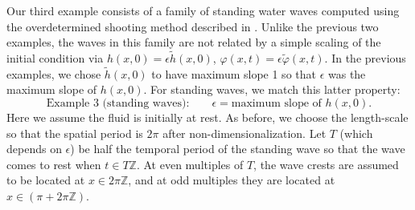 \documentclass[11pt]{article}
\theoremstyle{plain}
\theoremstyle{definition}
\theoremstyle{definition}
\newcommand{\eps}{\epsilon}
\def\bbZ{{\mathbb Z}}
\begin{document}
Our third example consists of a family of standing water waves
computed using the overdetermined shooting method described in
\cite{wilkening:standing-waves-2011,wilkening-yu:shooting-2012}. Unlike
the previous two examples, the waves in this family are not related by
a simple scaling of the initial condition via $h(x,0)=\eps\tilde
h(x,0)$, $\varphi(x,t)=\eps\tilde\varphi(x,t)$.
%
%
In the previous examples, we chose $\tilde h(x,0)$ to have maximum slope 1 so
that $\eps$ was the maximum slope of $h(x,0)$.  For standing waves, we
match this latter property:
%
\begin{equation}\label{eq:stand:eps}
  \text{Example 3 (standing waves):}\qquad \eps = \text{
    maximum slope of $h(x,0)$.}
\end{equation}
%
Here we assume the fluid is initially at rest.
As before, we choose the length-scale so that the spatial period
is $2\pi$ after non-dimensionalization. Let $T$ (which depends on
  $\eps$) be half the temporal period of the standing wave so that
the wave comes to rest when $t\in T\bbZ$. At even multiples of $T$,
the wave crests are assumed to be located at $x\in2\pi\bbZ$, and
at odd multiples they are located at $x\in(\pi+2\pi\bbZ)$.
\end{document}

